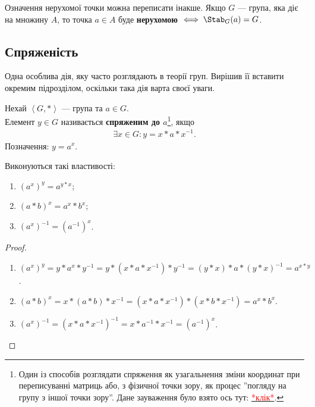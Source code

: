 \documentclass{math_library}
\begin{document}
\begin{remark}
Означення нерухомої точки можна переписати інакше. Якщо $G$ --- група, яка діє на множину $A$, то точка $a \in A$ буде \textbf{нерухомою} $\iff \Stab_G(a) = G$.
\end{remark}

\subsection{Спряженість}
Одна особлива дія, яку часто розглядають в теорії груп. Вирішив її вставити окремим підрозділом, оскільки така дія варта своєї уваги.

\begin{definition}
Нехай $\left<G,*\right>$ --- група та $a \in G$.\\
Елемент $y \in G$ називається \textbf{спряженим до $a$}\footnote{Один із способів розглядати спряження як узагальнення зміни координат при переписуванні матриць або, з фізичної точки зору, як процес ''погляду на групу з іншої точки зору''. Дане зауваження було взято ось тут: \href{https://math.stackexchange.com/questions/11971/intuition-behind-conjugation-in-group-theory}{\textcolor{red}{*клік*}}.}, якщо
\begin{align*}
\exists x \in G: y = x*a*x^{-1}.
\end{align*}
Позначення: $y = a^x$.
\end{definition}

\begin{proposition}
Виконуються такі властивості:
\begin{enumerate}[nosep,wide=0pt,label={\arabic*)}]
\item $(a^x)^y = a^{y*x}$;
\item $(a*b)^x = a^x*b^x$;
\item $(a^x)^{-1} = (a^{-1})^x$.
\end{enumerate}
\end{proposition}

\begin{proof}
\begin{enumerate}[topsep=0pt,nosep,wide=0pt,label={\arabic*)}]
\item $(a^x)^y = y*a^x*y^{-1} = y*(x*a*x^{-1})*y^{-1} = (y*x) * a * (y*x)^{-1} = a^{x*y}$.
\item $(a*b)^x = x*(a*b)*x^{-1} = (x*a*x^{-1})*(x*b*x^{-1}) = a^x*b^x$.
\item $(a^x)^{-1} = (x*a*x^{-1})^{-1} = x*a^{-1}*x^{-1} = (a^{-1})^x$. \qedhere
\end{enumerate}
\end{proof}
\end{document}
